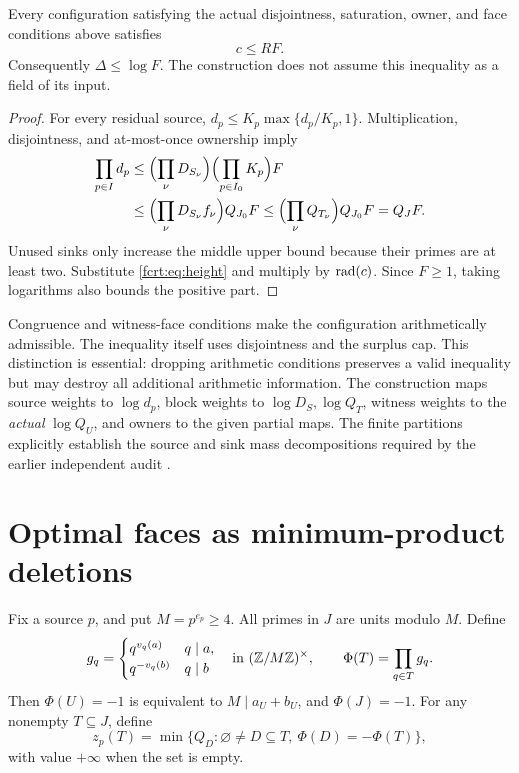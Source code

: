 \begin{theorem}\label{fcrt:thm:certificate}
Every configuration satisfying the actual disjointness, saturation, owner,
and face conditions above satisfies
\begin{equation}\label{fcrt:eq:rationalbridge} c\le R F.\end{equation}
Consequently \(\Delta\le\log F\). The construction does not assume this
inequality as a field of its input.
\end{theorem}
\begin{proof}
For every residual source,
\(d_p\le K_p\max\{d_p/K_p,1\}\).
Multiplication, disjointness, and at-most-once ownership imply
\begin{align*}
 \prod_{p\in I}d_p
 &\le \Bigl(\prod_\nu D_{S_\nu}\Bigr)
       \Bigl(\prod_{p\in I_0}K_p\Bigr)F\\
 &\le \Bigl(\prod_\nu D_{S_\nu}f_\nu\Bigr) Q_{J_0} F
 \le \Bigl(\prod_\nu Q_{T_\nu}\Bigr)Q_{J_0}F=Q_JF.
\end{align*}
Unused sinks only increase the middle upper bound because their primes are
at least two. Substitute \eqref{fcrt:eq:height} and multiply by \(\operatorname{rad}(c)\).
Since \(F\ge1\), taking logarithms also bounds the positive part.
\end{proof}

\begin{remark}
Congruence and witness-face conditions make the configuration arithmetically
admissible. The inequality itself uses disjointness and the surplus cap.
This distinction is essential: dropping arithmetic conditions preserves a
valid inequality but may destroy all additional arithmetic information.
The construction maps source weights to \(\log d_p\), block weights to
\(\log D_S,\log Q_T\), witness weights to the \emph{actual} \(\log Q_U\),
and owners to the given partial maps. The finite partitions explicitly
establish the source and sink mass decompositions required by the earlier
independent audit \cite{fcrt:repoaudit}.
\end{remark}

\section{Optimal faces as minimum-product deletions}
Fix a source \(p\), and put \(M=p^{e_p}\ge4\).
All primes in \(J\) are units modulo \(M\). Define
\[
 g_q=\begin{cases}q^{v_q(a)}&q\mid a,\\q^{-v_q(b)}&q\mid b\end{cases}
 \quad\text{in }(\mathbb Z/M\mathbb Z)^\times,
 \qquad \Phi(T)=\prod_{q\in T}g_q.
\]
Then \(\Phi(U)=-1\) is equivalent to \(M\mid a_U+b_U\), and
\(\Phi(J)=-1\).
For any nonempty \(T\subseteq J\), define
\begin{equation}\label{fcrt:eq:z}
 z_p(T)=\min\{Q_D:\varnothing\ne D\subseteq T,
                         \ \Phi(D)=-\Phi(T)\},
\end{equation}
with value \(+\infty\) when the set is empty.

